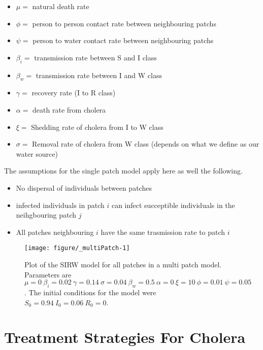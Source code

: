 \documentclass[12pt]{article}\usepackage[]{graphicx}\usepackage[]{color}
\makeatletter
\def\maxwidth{ %
  \ifdim\Gin@nat@width>\linewidth
    \linewidth
  \else
    \Gin@nat@width
  \fi
}
\newenvironment{knitrout}{}{} %
\makeatother
\begin{document}
\begin{itemize}
    \item$\mu=$ natural death rate
    \item$\phi=$ person to person contact rate between neighbouring patchs
    \item$\psi=$ person to water contact rate between neighbouring patchs
    \item$\beta_i=$ transmission rate between S and I class
    \item$\beta_w=$ transmission rate between I and W class
    \item$\gamma=$ recovery rate (I to R class)
    \item$\alpha=$ death rate from cholera
    \item$\xi=$ Shedding rate of cholera from I to W class
    \item$\sigma=$	Removal rate of cholera from W class (depends on what we define as our water source)
\end{itemize}
The assumptions for the single patch model apply here as well the following.
\begin{itemize}
    \item No dispersal of individuals between patches
    \item infected individuals in patch $i$ can infect succeptible individuals in the neihgbouring patch $j$
    \item All patches neighbouring $i$ have the same trasmission rate to patch $i$
\end{itemize}

\begin{knitrout}
\color{fgcolor}\begin{figure}
\texttt{[image: figure/\_multiPatch-1]} \caption{\label{fig:multipatch} Plot of the SIRW model for all patches in a multi patch model. Parameters are $\mu=0\ \beta_i=0.02\ \gamma=0.14\ \sigma=0.04\ \beta_w=0.5\ \alpha=0\ \xi=10\ \phi=0.01\ \psi=0.05$. The initial conditions for the model were $S_0=0.94\ I_0=0.06\ R_0=0$.}\label{fig:<multiPatch}
\end{figure}


\end{knitrout}
\FloatBarrier
\section{Treatment Strategies For Cholera}

\end{document}
